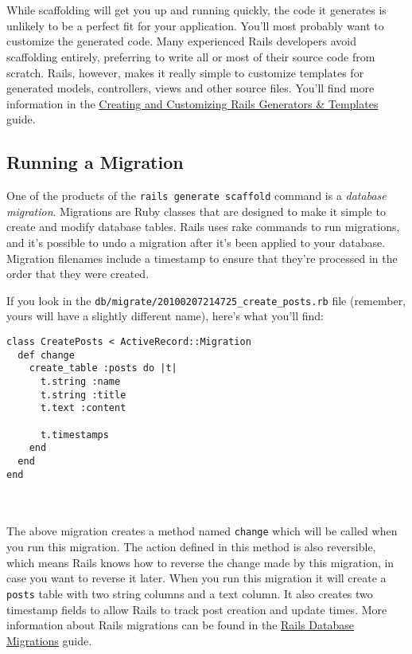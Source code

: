 \documentclass[10pt]{book}
\begin{document}
\\ \\

While scaffolding will get you up and running quickly, the code it generates is unlikely to be a perfect fit for your application. You’ll most probably want to customize the generated code. Many experienced Rails developers avoid scaffolding entirely, preferring to write all or most of their source code from scratch. Rails, however, makes it really simple to customize templates for generated models, controllers, views and other source files. You’ll find more information in the \href{http://guides.rubyonrails.org/generators.html}{Creating and Customizing Rails Generators \& Templates} guide.

\subsection{ Running a Migration}

One of the products of the \texttt{rails generate scaffold} command is a \emph{database migration}. Migrations are Ruby classes that are designed to make it simple to create and modify database tables. Rails uses rake commands to run migrations, and it’s possible to undo a migration after it’s been applied to your database. Migration filenames include a timestamp to ensure that they’re processed in the order that they were created.

If you look in the \texttt{db/migrate/20100207214725\_create\_posts.rb} file (remember, yours will have a slightly different name), here’s what you’ll find:

\begin{minipage}{\textwidth}
\begin{verbatim}
class CreatePosts < ActiveRecord::Migration
  def change
    create_table :posts do |t|
      t.string :name
      t.string :title
      t.text :content
 
      t.timestamps
    end
  end
end
\end{verbatim}
\end{minipage}
\\ \\

The above migration creates a method named \texttt{change} which will be called when you run this migration. The action defined in this method is also reversible, which means Rails knows how to reverse the change made by this migration, in case you want to reverse it later. When you run this migration it will create a \texttt{posts} table with two string columns and a text column. It also creates two timestamp fields to allow Rails to track post creation and update times. More information about Rails migrations can be found in the \href{http://guides.rubyonrails.org/migrations.html}{Rails Database Migrations} guide.
\end{document}
